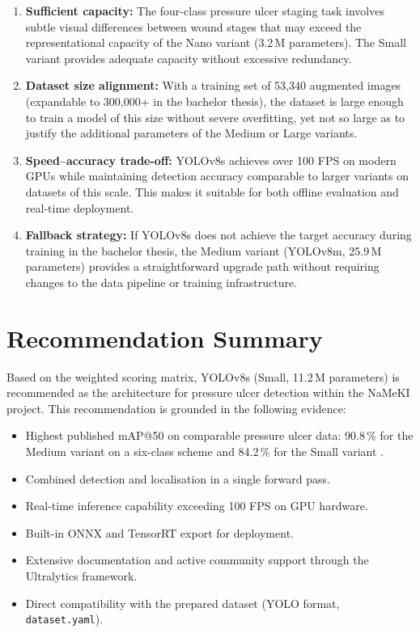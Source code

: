 \documentclass[a4paper,12pt,twoside]{report}
\begin{document}
\begin{enumerate}
  \item \textbf{Sufficient capacity:} The four-class pressure ulcer staging task
    involves subtle visual differences between wound stages that may exceed the
    representational capacity of the Nano variant (3.2\,M parameters). The Small
    variant provides adequate capacity without excessive redundancy.

  \item \textbf{Dataset size alignment:} With a training set of 53,340 augmented
    images (expandable to 300,000+ in the bachelor thesis), the dataset is large
    enough to train a model of this size without severe overfitting, yet not so
    large as to justify the additional parameters of the Medium or Large variants.

  \item \textbf{Speed--accuracy trade-off:} YOLOv8s achieves over 100 FPS on
    modern GPUs while maintaining detection accuracy comparable to larger variants
    on datasets of this scale. This makes it suitable for both offline evaluation
    and real-time deployment.

  \item \textbf{Fallback strategy:} If YOLOv8s does not achieve the target
    accuracy during training in the bachelor thesis, the Medium variant
    (YOLOv8m, 25.9\,M parameters) provides a straightforward upgrade path
    without requiring changes to the data pipeline or training infrastructure.
\end{enumerate}

\section{Recommendation Summary}
\label{sec:recommendation}

Based on the weighted scoring matrix, YOLOv8s (Small, 11.2\,M parameters) is
recommended as the architecture for pressure ulcer detection within the NaMeKI
project. This recommendation is grounded in the following evidence:

\begin{itemize}
  \item Highest published mAP@50 on comparable pressure ulcer data: 90.8\,\%
    for the Medium variant on a six-class scheme \citep{chang2024diagnosis} and
    84.2\,\% for the Small variant \citep{tusar2026ai}.
  \item Combined detection and localisation in a single forward pass.
  \item Real-time inference capability exceeding 100 FPS on GPU hardware.
  \item Built-in ONNX and TensorRT export for deployment.
  \item Extensive documentation and active community support through the
    Ultralytics framework.
  \item Direct compatibility with the prepared dataset (YOLO format,
    \texttt{dataset.yaml}).
\end{itemize}
\end{document}
